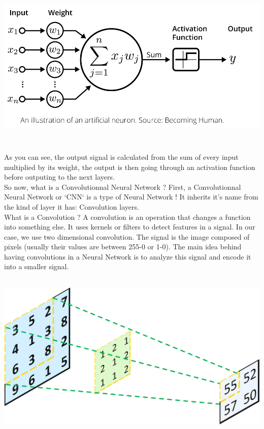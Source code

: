 \documentclass[12pt]{article}
\begin{document}
\centerline{\includegraphics[height=8cm]{../../docs/activation-function.png}}

As you can see, the output signal is calculated from the sum of every input multiplied by its weight, the output is then going through an activation function before outputing to the next layers. \\


So now, what is a Convolutionnal Neural Network ?
First, a Convolutionnal Neural Network or `CNN` is a type of Neural Network ! It inherits it's name from the kind of layer it has: Convolution layers. \\

What is a Convolution ? 
A convolution is an operation that changes a function into something else. It uses kernels or filters to detect features in a signal. In our case, we use two dimensional convolution. The signal is the image composed of pixels (usually their values are between 255-0 or 1-0). The main idea behind having convolutions in a Neural Network is to analyze this signal and encode it into a smaller signal.

\centerline{\includegraphics[height=8cm]{../../docs/convolution.png}}
\end{document}
